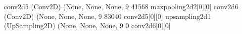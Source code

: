 \documentclass[letterpaper,10pt,english]{sphinxmanual}
\begin{document}
\begin{sphinxVerbatim}[commandchars=\\\{\}]
conv2d\PYGZus{}5 (Conv2D)               (None, None, None, 9 41568       max\PYGZus{}pooling2d\PYGZus{}2[0][0]            
\PYGZus{}\PYGZus{}\PYGZus{}\PYGZus{}\PYGZus{}\PYGZus{}\PYGZus{}\PYGZus{}\PYGZus{}\PYGZus{}\PYGZus{}\PYGZus{}\PYGZus{}\PYGZus{}\PYGZus{}\PYGZus{}\PYGZus{}\PYGZus{}\PYGZus{}\PYGZus{}\PYGZus{}\PYGZus{}\PYGZus{}\PYGZus{}\PYGZus{}\PYGZus{}\PYGZus{}\PYGZus{}\PYGZus{}\PYGZus{}\PYGZus{}\PYGZus{}\PYGZus{}\PYGZus{}\PYGZus{}\PYGZus{}\PYGZus{}\PYGZus{}\PYGZus{}\PYGZus{}\PYGZus{}\PYGZus{}\PYGZus{}\PYGZus{}\PYGZus{}\PYGZus{}\PYGZus{}\PYGZus{}\PYGZus{}\PYGZus{}\PYGZus{}\PYGZus{}\PYGZus{}\PYGZus{}\PYGZus{}\PYGZus{}\PYGZus{}\PYGZus{}\PYGZus{}\PYGZus{}\PYGZus{}\PYGZus{}\PYGZus{}\PYGZus{}\PYGZus{}\PYGZus{}\PYGZus{}\PYGZus{}\PYGZus{}\PYGZus{}\PYGZus{}\PYGZus{}\PYGZus{}\PYGZus{}\PYGZus{}\PYGZus{}\PYGZus{}\PYGZus{}\PYGZus{}\PYGZus{}\PYGZus{}\PYGZus{}\PYGZus{}\PYGZus{}\PYGZus{}\PYGZus{}\PYGZus{}\PYGZus{}\PYGZus{}\PYGZus{}\PYGZus{}\PYGZus{}\PYGZus{}\PYGZus{}\PYGZus{}\PYGZus{}\PYGZus{}\PYGZus{}
conv2d\PYGZus{}6 (Conv2D)               (None, None, None, 9 83040       conv2d\PYGZus{}5[0][0]                   
\PYGZus{}\PYGZus{}\PYGZus{}\PYGZus{}\PYGZus{}\PYGZus{}\PYGZus{}\PYGZus{}\PYGZus{}\PYGZus{}\PYGZus{}\PYGZus{}\PYGZus{}\PYGZus{}\PYGZus{}\PYGZus{}\PYGZus{}\PYGZus{}\PYGZus{}\PYGZus{}\PYGZus{}\PYGZus{}\PYGZus{}\PYGZus{}\PYGZus{}\PYGZus{}\PYGZus{}\PYGZus{}\PYGZus{}\PYGZus{}\PYGZus{}\PYGZus{}\PYGZus{}\PYGZus{}\PYGZus{}\PYGZus{}\PYGZus{}\PYGZus{}\PYGZus{}\PYGZus{}\PYGZus{}\PYGZus{}\PYGZus{}\PYGZus{}\PYGZus{}\PYGZus{}\PYGZus{}\PYGZus{}\PYGZus{}\PYGZus{}\PYGZus{}\PYGZus{}\PYGZus{}\PYGZus{}\PYGZus{}\PYGZus{}\PYGZus{}\PYGZus{}\PYGZus{}\PYGZus{}\PYGZus{}\PYGZus{}\PYGZus{}\PYGZus{}\PYGZus{}\PYGZus{}\PYGZus{}\PYGZus{}\PYGZus{}\PYGZus{}\PYGZus{}\PYGZus{}\PYGZus{}\PYGZus{}\PYGZus{}\PYGZus{}\PYGZus{}\PYGZus{}\PYGZus{}\PYGZus{}\PYGZus{}\PYGZus{}\PYGZus{}\PYGZus{}\PYGZus{}\PYGZus{}\PYGZus{}\PYGZus{}\PYGZus{}\PYGZus{}\PYGZus{}\PYGZus{}\PYGZus{}\PYGZus{}\PYGZus{}\PYGZus{}\PYGZus{}\PYGZus{}
up\PYGZus{}sampling2d\PYGZus{}1 (UpSampling2D)  (None, None, None, 9 0           conv2d\PYGZus{}6[0][0]                   
\PYGZus{}\PYGZus{}\PYGZus{}\PYGZus{}\PYGZus{}\PYGZus{}\PYGZus{}\PYGZus{}\PYGZus{}\PYGZus{}\PYGZus{}\PYGZus{}\PYGZus{}\PYGZus{}\PYGZus{}\PYGZus{}\PYGZus{}\PYGZus{}\PYGZus{}\PYGZus{}\PYGZus{}\PYGZus{}\PYGZus{}\PYGZus{}\PYGZus{}\PYGZus{}\PYGZus{}\PYGZus{}\PYGZus{}\PYGZus{}\PYGZus{}\PYGZus{}\PYGZus{}\PYGZus{}\PYGZus{}\PYGZus{}\PYGZus{}\PYGZus{}\PYGZus{}\PYGZus{}\PYGZus{}\PYGZus{}\PYGZus{}\PYGZus{}\PYGZus{}\PYGZus{}\PYGZus{}\PYGZus{}\PYGZus{}\PYGZus{}\PYGZus{}\PYGZus{}\PYGZus{}\PYGZus{}\PYGZus{}\PYGZus{}\PYGZus{}\PYGZus{}\PYGZus{}\PYGZus{}\PYGZus{}\PYGZus{}\PYGZus{}\PYGZus{}\PYGZus{}\PYGZus{}\PYGZus{}\PYGZus{}\PYGZus{}\PYGZus{}\PYGZus{}\PYGZus{}\PYGZus{}\PYGZus{}\PYGZus{}\PYGZus{}\PYGZus{}\PYGZus{}\PYGZus{}\PYGZus{}\PYGZus{}\PYGZus{}\PYGZus{}\PYGZus{}\PYGZus{}\PYGZus{}\PYGZus{}\PYGZus{}\PYGZus{}\PYGZus{}\PYGZus{}\PYGZus{}\PYGZus{}\PYGZus{}\PYGZus{}\PYGZus{}\PYGZus{}\PYGZus{}

\end{sphinxVerbatim}
\end{document}
